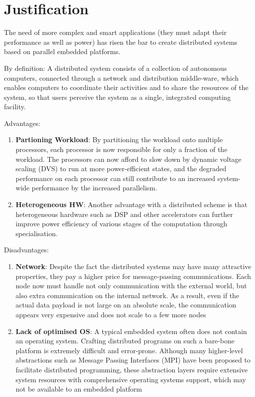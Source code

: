 \documentclass[a4paper]{article}
\begin{document}
\section{Justification}

The need of more complex and smart applications (they must adapt their
performance as well as power) has risen the bar to create distributed systems
based on parallel embedded platforms. 

By definition: A distributed system consists of a collection of autonomous
computers, connected through a network and distribution middle-ware, which
enables computers to coordinate their activities and to share the resources of
the system, so that users perceive the system as a single, integrated computing
facility.

Advantages: 

\begin{enumerate} 
    
    \item \textbf{Partioning Workload}: 
    By partitioning the workload onto multiple processors, 
    each processor is now responsible for only a fraction of the workload. 
    The processors can now afford to slow down by dynamic voltage scaling 
    (DVS) to run at more power-efficient states, and the degraded performance 
    on each processor can still contribute to an increased system-wide 
    performance by the increased parallelism.  

    \item \textbf{Heterogeneous HW}: 
    Another advantage with a distributed scheme is that heterogeneous hardware 
    such as DSP and other accelerators can further improve power efficiency 
    of various stages of the computation through specialisation.

\end{enumerate}
 

Disadvantages: 

\begin{enumerate}
    \item \textbf{Network}: Despite the fact the distributed systems may have
    many attractive properties, they pay a higher price for message-passing 
    communications. Each node now must handle not only communication with 
    the external world, but also extra communication on the internal network. 
    As a result, even if the actual data payload is not large on an absolute 
    scale, the communication appears very expensive and does not scale to a few
    more nodes

    \item \textbf{Lack of optimised OS}: A typical embedded system often does
    not contain an operating system. Crafting distributed programs on such a
    bare-bone platform is extremely difficult and error-prone. Although many
    higher-level abstractions such as Message Passing Interfaces (MPI) have been
    proposed to facilitate distributed programming, these abstraction layers require
    extensive system resources with comprehensive operating systems support, which
    may not be available to an embedded platform 
    
\end{enumerate}
 
\end{document}
